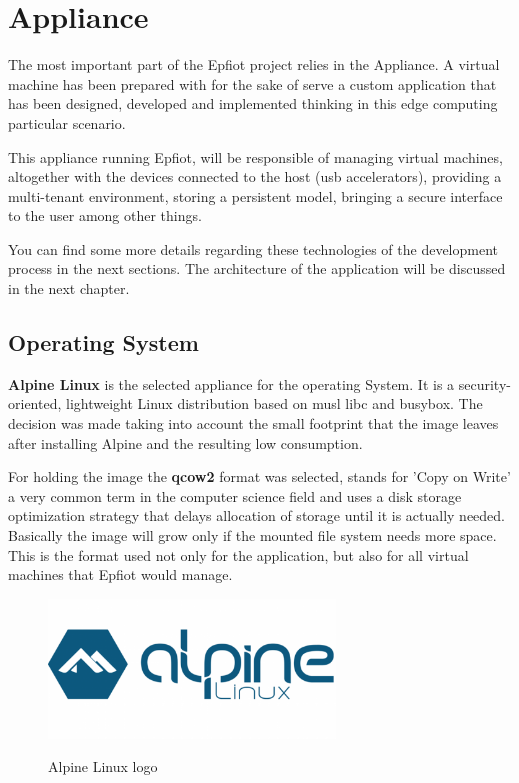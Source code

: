 \section{Appliance}
\label{makereference3.2}
The most important part of the Epfiot project relies in the Appliance. A virtual machine has been prepared with for the sake of serve a custom application that has been designed, developed and implemented thinking in this edge computing particular scenario.

This appliance running Epfiot, will be responsible of managing virtual machines, altogether with the devices connected to the host (usb accelerators), providing a multi-tenant environment, storing a persistent model, bringing a secure interface to the user among other things.

You can find some more details regarding these technologies of the development process in the next sections. The architecture of the application will be discussed in the next chapter.

\subsection{Operating System}
\label{makereference3.2.1}
\textbf{Alpine Linux} is the selected appliance for the operating System. It is a security-oriented, lightweight Linux distribution based on musl libc and busybox.
The decision was made taking into account the small footprint that the image leaves after installing Alpine and the resulting low consumption. 

For holding the image the \textbf{qcow2} format was selected, stands for 'Copy on Write' a very common term in the computer science field and uses a disk storage optimization strategy that delays allocation of storage until it is actually needed. Basically the image will grow only if the mounted file system needs more space. This is the format used not only for the application, but also for all virtual machines that Epfiot would manage.

\begin{figure}[h!]%
\centering
    \includegraphics[width=3in]{figures/alpine.png}
~\caption{Alpine Linux logo}
\label{figure3.3}
\end{figure}
\newpage


